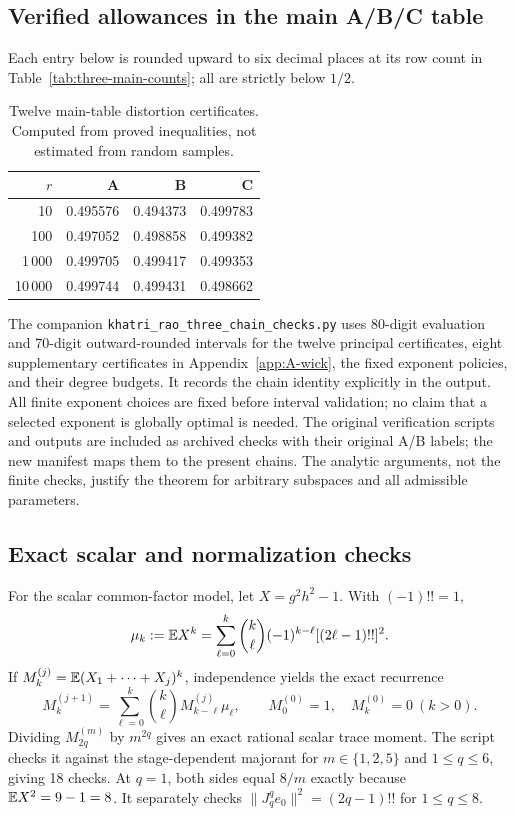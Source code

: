 \documentclass[11pt]{article}
\numberwithin{equation}{section}
\theoremstyle{definition}\newtheorem{definition}[theorem]{Definition}
\theoremstyle{remark}\newtheorem{remark}[theorem]{Remark}
\newcommand{\norm}[1]{\lVert#1\rVert}\newcommand{\ip}[2]{\langle#1,#2\rangle}
\begin{document}
\subsection{Verified allowances in the main A/B/C table}
Each entry below is rounded upward to six decimal places at its row count in
Table~\ref{tab:three-main-counts}; all are strictly below $1/2$.
\begin{table}[H]\centering\small
\setlength{\tabcolsep}{12pt}\renewcommand{\arraystretch}{1.2}
\begin{tabular}{@{}rrrr@{}}
\toprule
$r$&\textbf{A}&\textbf{B}&\textbf{C}\\
\midrule
10&0.495576&0.494373&0.499783\\
100&0.497052&0.498858&0.499382\\
1\,000&0.499705&0.499417&0.499353\\
10\,000&0.499744&0.499431&0.498662\\
\bottomrule
\end{tabular}
\caption{Twelve main-table distortion certificates. Computed from proved
inequalities, not estimated from random samples.}\label{tab:allowances}
\end{table}

The companion \texttt{khatri\_rao\_three\_chain\_checks.py} uses 80-digit evaluation
and 70-digit outward-rounded intervals for the twelve principal certificates,
eight supplementary certificates in Appendix~\ref{app:A-wick}, the fixed exponent
policies, and their degree budgets. It records the chain identity explicitly in
the output. All finite exponent choices are fixed before interval validation;
no claim that a selected exponent is globally optimal is needed.
The original verification scripts and outputs are included as archived checks
with their original A/B labels; the new manifest maps them to the present chains.
The analytic arguments, not the finite checks, justify the theorem for arbitrary
subspaces and all admissible parameters.

\subsection{Exact scalar and normalization checks}
For the scalar common-factor model, let $X=g^2h^2-1$. With $(-1)!!=1$,
\begin{equation}\label{eq:scalar-check}
 \mu_k:=\mathbb E X^k
 =\sum_{\ell=0}^k\binom{k}{\ell}(-1)^{k-\ell}[(2\ell-1)!!]^2.
\end{equation}
If $M_k^{(j)}=\mathbb E(X_1+\cdots+X_j)^k$, independence yields the exact recurrence
\[
 M_k^{(j+1)}=\sum_{\ell=0}^k\binom{k}{\ell}M_{k-\ell}^{(j)}\mu_\ell,
 \qquad M_0^{(0)}=1,\quad M_k^{(0)}=0\ (k>0).
\]
Dividing $M_{2q}^{(m)}$ by $m^{2q}$ gives an exact rational scalar trace moment.
The script checks it against the stage-dependent majorant for
$m\in\{1,2,5\}$ and $1\le q\le6$, giving 18 checks.
At $q=1$, both sides equal $8/m$ exactly because $\mathbb E X^2=9-1=8$.
It separately checks
$\norm{J_q^qe_0}^2=(2q-1)!!$ for $1\le q\le8$.
\end{document}
